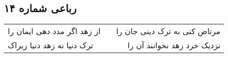 \begin{center}
\section*{رباعی شماره ۱۴}
\label{sec:sh014}
\begin{longtable}{l p{0.5cm} r}
از زهد اگر مدد دهی ایمان را
&&
مرتاض کنی به ترک دینی جان را
\\
ترک دنیا نه زهد دنیا زیراک
&&
نزدیک خرد زهد نخوانند آن را
\\
\end{longtable}
\end{center}
